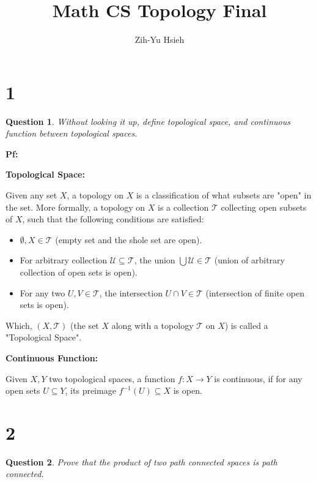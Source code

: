 \documentclass{article}
\title{Math CS Topology Final}
\author{Zih-Yu Hsieh}
\newtheorem{question}{Question}
\begin{document}
\maketitle

\section*{1}
\begin{myBox}[]{}
    \begin{question}
        Without looking it up, define topological space, and continuous function
        between topological spaces.
    \end{question}
\end{myBox}

\textbf{Pf:}

\textbf{Topological Space:}

Given any set $X$, a topology on $X$ is a classification of what subsets are "open" in the set.
More formally, a topology on $X$ is a collection $\mathcal{T}$ collecting open subsets of $X$, such that the following conditions are satisfied:
\begin{itemize}
    \item[(1)] $\emptyset, X\in \mathcal{T}$ (empty set and the shole set are open).
    \item[(2)] For arbitrary collection $\mathcal{U}\subseteq \mathcal{T}$, the union $\bigcup \mathcal{U}\in \mathcal{T}$ (union of arbitrary collection of open sets is open). 
    \item[(3)] For any two $U,V\in \mathcal{T}$, the intersection $U\cap V\in \mathcal{T}$ (intersection of finite open sets is open). 
\end{itemize}

Which, $(X,\mathcal{T})$ (the set $X$ along with a topology $\mathcal{T}$ on $X$) is called a "Topological Space".

\hfil

\textbf{Continuous Function:}

Given $X,Y$ two topological spaces, a function $f:X\rightarrow Y$ is continuous, if for any open sets $U\subseteq Y$, its preimage $f^{-1}(U)\subseteq X$ is open.

\break

\section*{2}
\begin{myBox}[]{}
    \begin{question}
        Prove that the product of two path connected spaces is path connected. 
    \end{question}
\end{myBox}
\end{document}
